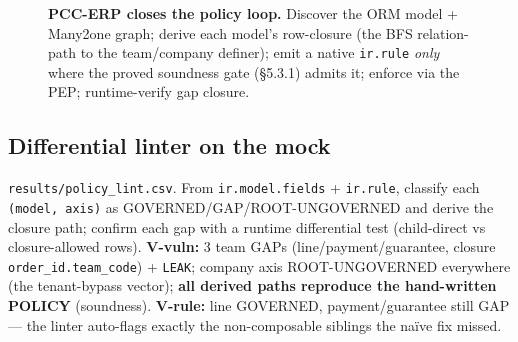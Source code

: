 \documentclass[11pt,a4paper]{article}
\newcommand{\code}[1]{\texttt{#1}}
\begin{document}
\begin{figure}[t]
\centering
{}
\caption{\textbf{PCC-ERP closes the policy loop.} Discover the ORM model + Many2one graph; derive each model's
row-closure (the BFS relation-path to the team/company definer); emit a native \texttt{ir.rule} \emph{only}
where the proved soundness gate (\S5.3.1) admits it; enforce via the PEP; runtime-verify gap closure.}
\label{fig:pcc}
\end{figure}

\subsection{Differential linter on the mock}
\code{results/policy_lint.csv}. From \code{ir.model.fields} + \code{ir.rule}, classify each
\code{(model, axis)} as GOVERNED/GAP/ROOT-UNGOVERNED and derive the closure path; confirm each gap with a
runtime differential test (child-direct vs closure-allowed rows). \textbf{V-vuln:} 3 team GAPs
(line/payment/guarantee, closure \code{order_id.team_code}) + \code{LEAK}; company axis ROOT-UNGOVERNED
everywhere (the tenant-bypass vector); \textbf{all derived paths reproduce the hand-written POLICY}
(soundness). \textbf{V-rule:} line GOVERNED, payment/guarantee still GAP --- the linter auto-flags exactly the
non-composable siblings the na\"ive fix missed.
\end{document}
